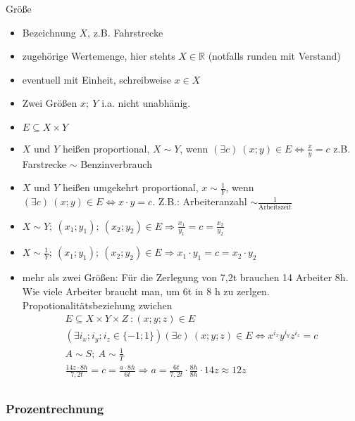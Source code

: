 Größe
\begin{itemize}
    \item Bezeichnung $X$, z.B. Fahrstrecke
    \item zugehörige Wertemenge, hier stehts $X\in \mathbb{R}$ (notfalls runden mit Verstand)
    \item eventuell mit Einheit, schreibweise $x \in X$
    \item Zwei Größen $x;\ Y$ i.a. nicht unabhänig.
    \item $E \subseteq X \times Y$
    \item $X$ und $Y$ heißen proportional, $X \sim Y$, wenn $(\exists c)\ (x;y) \in E \Leftrightarrow \frac{x}{y}=c$ z.B. Farstrecke $\sim$ Benzinverbrauch
    \item $X$ und $Y$ heißen umgekehrt proportional, $x \sim \frac{1}{Y}$, wenn $(\exists c)\ (x;y) \in E \Leftrightarrow x \cdot y = c$. Z.B.: Arbeiteranzahl $\sim \frac{1}{\textrm{Arbeitszeit}}$
    \item $X \sim Y;\ (x_1;y_1);\ (x_2;y_2) \in E \Rightarrow \frac{x_1}{y_1} = c = \frac{x_2}{y_2}$
    \item $X \sim \frac{1}{Y};\ (x_1;y_1);\ (x_2;y_2) \in E \Rightarrow x_1 \cdot y_1 = c = x_2 \cdot y_2$
    \item mehr als zwei Größen: Für die Zerlegung von 7,2t brauchen 14 Arbeiter 8h. Wie viele Arbeiter braucht man, um 6t in 8 h zu zerlgen. \\
    Propotionalitätsbeziehung zwichen \begin{gather*}
                                          E \subseteq X \times  Y \times Z\ : (x; y; z) \in E\\
                                          (\exists i_x; i_y; i_z \in \lbrace -1; 1 \rbrace) (\exists c)\ (x;y;z) \in E \Leftrightarrow x^{i_x}y^{i_y}z^{i_z} = c\\
                                          A \sim S;\ A \sim \frac{1}{T}\\
                                          \frac{14z \cdot 8h}{7{,}2t}=c=\frac{a \cdot 8h}{6t} \Rightarrow a = \frac{6t}{7{,}2t}\cdot \frac{8h}{8h} \cdot 14z \approx 12z\\
    \end{gather*}
\end{itemize}

\subsubsection{Prozentrechnung}

